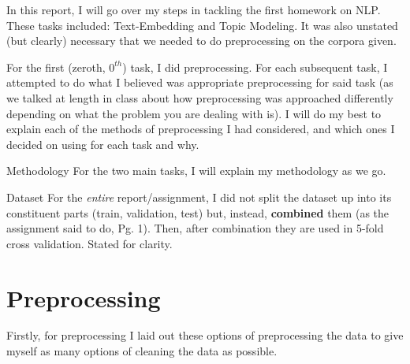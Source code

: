 \documentclass[12pt]{article}
\begin{document}
\maketitlepage

In this report, I will go over my steps in tackling the first homework on NLP. These tasks included: 
Text-Embedding and Topic Modeling. It was also unstated (but clearly) necessary that we needed to do 
preprocessing on the corpora given.

For the first (zeroth, $0^{th}$) task, I did preprocessing. For each subsequent task, I attempted to do what I 
believed was appropriate preprocessing for said task (as we talked at length in class about how 
preprocessing was approached differently depending on what the problem you are dealing with is). I will 
do my best to explain each of the methods of preprocessing I had considered, and which ones I decided on 
using for each task and why.

\begin{aside}{Methodology}
For the two main tasks, I will explain my methodology as we go. 
\end{aside}

\begin{important}{Dataset}
    For the \textit{entire} report/assignment, I did not split the dataset up into its constituent parts 
    (train, validation, test) but, instead, \textbf{combined} them (as the assignment said to do, Pg. 1). Then, after combination 
    they are used in 5-fold cross validation. Stated for clarity.
\end{important}


\section*{Preprocessing}

Firstly, for preprocessing I laid out these options of preprocessing the data to give myself as many options 
of cleaning the data as possible.
\end{document}
